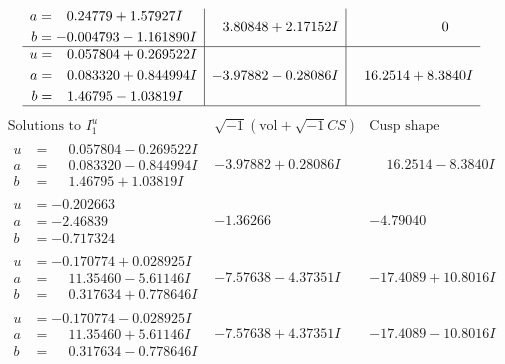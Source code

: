 \documentclass[1p]{elsarticle_modified}
\theoremstyle{definition}
\newcommand{\I}{\sqrt{-1}}
\begin{document}
$$\begin{array}{c|c|c}
\begin{aligned}
a &= \phantom{-}0.24779 + 1.57927 I \\
b &= -0.004793 - 1.161890 I\end{aligned}
 & \phantom{-}3.80848 + 2.17152 I & \phantom{-0.000000 } 0 \\ \hline\begin{aligned}
u &= \phantom{-}0.057804 + 0.269522 I \\
a &= \phantom{-}0.083320 + 0.844994 I \\
b &= \phantom{-}1.46795 - 1.03819 I\end{aligned}
 & -3.97882 - 0.28086 I & \phantom{-}16.2514 + 8.3840 I\\
 \hline 
 \end{array}$$\newpage$$\begin{array}{c|c|c}  
\text{Solutions to }I^u_{1}& \I (\text{vol} + \sqrt{-1}CS) & \text{Cusp shape}\\
 \hline 
\begin{aligned}
u &= \phantom{-}0.057804 - 0.269522 I \\
a &= \phantom{-}0.083320 - 0.844994 I \\
b &= \phantom{-}1.46795 + 1.03819 I\end{aligned}
 & -3.97882 + 0.28086 I & \phantom{-}16.2514 - 8.3840 I \\ \hline\begin{aligned}
u &= -0.202663\phantom{ +0.000000I} \\
a &= -2.46839\phantom{ +0.000000I} \\
b &= -0.717324\phantom{ +0.000000I}\end{aligned}
 & -1.36266\phantom{ +0.000000I} & -4.79040\phantom{ +0.000000I} \\ \hline\begin{aligned}
u &= -0.170774 + 0.028925 I \\
a &= \phantom{-}11.35460 - 5.61146 I \\
b &= \phantom{-}0.317634 + 0.778646 I\end{aligned}
 & -7.57638 - 4.37351 I & -17.4089 + 10.8016 I \\ \hline\begin{aligned}
u &= -0.170774 - 0.028925 I \\
a &= \phantom{-}11.35460 + 5.61146 I \\
b &= \phantom{-}0.317634 - 0.778646 I\end{aligned}
 & -7.57638 + 4.37351 I & -17.4089 - 10.8016 I \\ \hline\begin{aligned}

\end{aligned}
\end{array}$$
\end{document}
